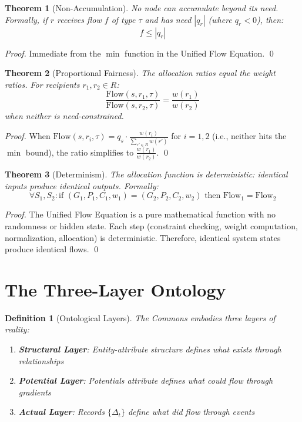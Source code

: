 \documentclass[11pt]{article}
\newtheorem{definition}{Definition}
\newtheorem{theorem}{Theorem}
\begin{document}
\begin{theorem}[Non-Accumulation]
No node can accumulate beyond its need. Formally, if $r$ receives flow $f$ of type $\tau$ and has need $|q_r|$ (where $q_r < 0$), then:
\[
f \leq |q_r|
\]
\end{theorem}

\begin{proof}
Immediate from the $\min$ function in the Unified Flow Equation. \qed
\end{proof}

\begin{theorem}[Proportional Fairness]
The allocation ratios equal the weight ratios. For recipients $r_1, r_2 \in R$:
\[
\frac{\text{Flow}(s, r_1, \tau)}{\text{Flow}(s, r_2, \tau)} = \frac{w(r_1)}{w(r_2)}
\]
when neither is need-constrained.
\end{theorem}

\begin{proof}
When $\text{Flow}(s, r_i, \tau) = q_s \cdot \frac{w(r_i)}{\sum_{r' \in R} w(r')}$ for $i = 1, 2$ (i.e., neither hits the $\min$ bound), the ratio simplifies to $\frac{w(r_1)}{w(r_2)}$. \qed
\end{proof}

\begin{theorem}[Determinism]
The allocation function is deterministic: identical inputs produce identical outputs. Formally:
\[
\forall S_1, S_2: \text{if } (G_1, P_1, C_1, w_1) = (G_2, P_2, C_2, w_2) \text{ then } \text{Flow}_1 = \text{Flow}_2
\]
\end{theorem}

\begin{proof}
The Unified Flow Equation is a pure mathematical function with no randomness or hidden state. Each step (constraint checking, weight computation, normalization, allocation) is deterministic. Therefore, identical system states produce identical flows. \qed
\end{proof}

\section{The Three-Layer Ontology}

\begin{definition}[Ontological Layers]
The Commons embodies three layers of reality:
\begin{enumerate}
\item \textbf{Structural Layer}: Entity-attribute structure defines what exists through relationships
\item \textbf{Potential Layer}: Potentials attribute defines what \emph{could} flow through gradients
\item \textbf{Actual Layer}: Records $\{\Delta_t\}$ define what \emph{did} flow through events
\end{enumerate}
\end{definition}
\end{document}
